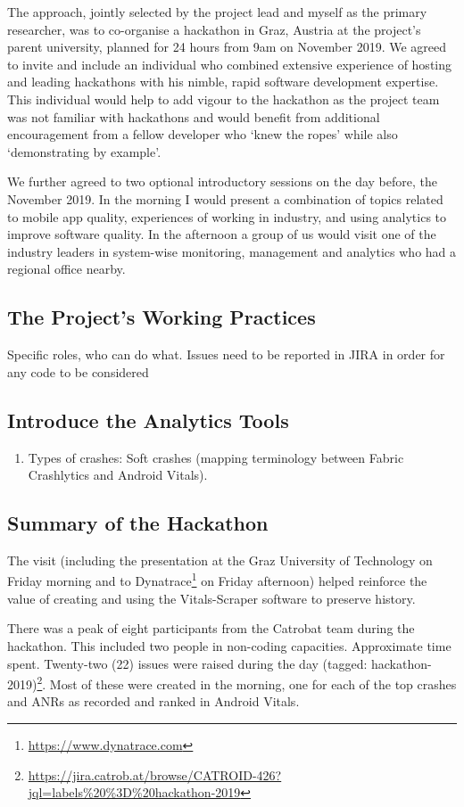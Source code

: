 The approach, jointly selected by the project lead %
and myself as the primary researcher,
was to co-organise a hackathon in Graz, Austria at the project's parent university, planned for 24 hours from 9am on  November 2019. We agreed to invite and include an individual who combined extensive experience of hosting and leading hackathons with his nimble, rapid software development expertise. This individual would help to add vigour to the hackathon as the project team was not familiar with hackathons and would benefit from additional encouragement from a fellow developer who `knew the ropes' while also `demonstrating by example'.

We further agreed to two optional introductory sessions on the day before, the~ November 2019. In the morning I would present a combination of topics related to mobile app quality, experiences of working in industry, and using analytics to improve software quality. In the afternoon a group of us would visit one of the industry leaders in system-wise monitoring, management and analytics who had a regional office nearby.



\subsection{The Project's Working Practices}
Specific roles, who can do what.
Issues need to be reported in JIRA in order for any code to be considered

\subsection{Introduce the Analytics Tools}
\begin{enumerate}
    \item Types of crashes: Soft crashes (mapping terminology between Fabric Crashlytics and Android Vitals).
\end{enumerate}

\subsection{Summary of the Hackathon}
The visit (including the presentation at the Graz University of Technology on Friday morning and to Dynatrace\footnote{\url{https://www.dynatrace.com}} on Friday afternoon) helped reinforce the value of creating and using the Vitals-Scraper software to preserve history. 

There was a peak of eight participants from the Catrobat team during the hackathon. This included two people %
in non-coding capacities. Approximate time spent. Twenty-two (22) issues were raised during the day (tagged: hackathon-2019)\footnote{\url{https://jira.catrob.at/browse/CATROID-426?jql=labels\%20\%3D\%20hackathon-2019}}. Most of these were created in the morning, one for each of the top crashes and ANRs as recorded and ranked in Android Vitals. 

